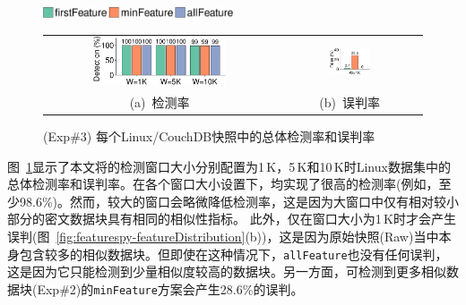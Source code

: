 \begin{figure}[!htb]
    \centering
    \includegraphics[width=0.5\textwidth]{pic/featurespy/plot/detection/overall/effectiveness-falsePositive_legend.pdf}
    \vspace{5pt}\\
    \begin{tabular}{@{\ }c@{\ }c}
        \includegraphics[width=0.6\textwidth]{pic/featurespy/plot/detection/overall/effectivenessLinux.pdf} &
        \includegraphics[width=0.3\textwidth]{pic/featurespy/plot/detection/overall/falsePositiveLinux.pdf}   \\
        \mbox{\small (a) 检测率}                                                                            &
        \mbox{\small (b) 误判率}                                                                              \\
    \end{tabular}
    \caption{(Exp\#3) 每个Linux/CouchDB快照中的总体检测率和误判率}
    \label{fig:featurespy-expDetectionOverallFalsePositive}
\end{figure}

图~\ref{fig:featurespy-expDetectionOverallFalsePositive}显示了本文将\sysnameF 的检测窗口大小分别配置为1\,K，5\,K和10\,K时Linux数据集中的总体检测率和误判率。在各个窗口大小设置下，\sysnameF 均实现了很高的检测率(例如，至少98.6\%)。然而，较大的窗口会略微降低检测率，这是因为大窗口中仅有相对较小部分的密文数据块具有相同的相似性指标。
此外，\sysnameF 仅在窗口大小为1\,K时才会产生误判(图~\ref{fig:featurespy-featureDistribution}(b))，这是因为原始快照(Raw)当中本身包含较多的相似数据块。但即使在这种情况下，{\tt allFeature}也没有任何误判，这是因为它只能检测到少量相似度较高的数据块。另一方面，可检测到更多相似数据块(Exp\#2)的{\tt minFeature}方案会产生28.6\%的误判。

